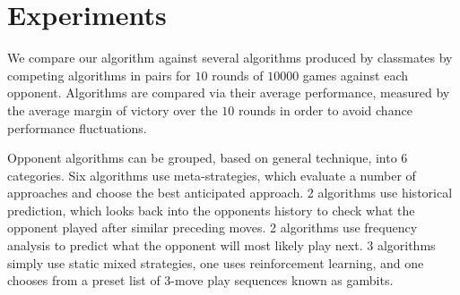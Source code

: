 
\section{Experiments}
\label{sec:expts}

We compare our algorithm against several algorithms produced by classmates by competing algorithms in pairs for $10$ rounds of $10000$ games against each opponent.  Algorithms are compared via their average performance, measured by the average margin of victory over the $10$ rounds in order to avoid chance performance fluctuations.

Opponent algorithms can be grouped, based on general technique, into 6 categories.  Six algorithms use meta-strategies, which evaluate a number of approaches and choose the best anticipated approach.  2 algorithms use historical prediction, which looks back into the opponents history to check what the opponent played after similar preceding moves.  2 algorithms use frequency analysis to predict what the opponent will most likely play next.  3 algorithms simply use static mixed strategies, one uses reinforcement learning, and one chooses from a preset list of 3-move play sequences known as gambits.

